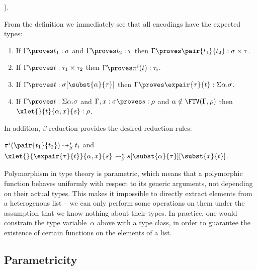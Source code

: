 
\cite[Chapter 6,7]{Kop2012}).

From the definition we immediately see that all encodings have the expected types:

\begin{lemma}\label{lem:encodings_types}
  \begin{enumerate}
  \item If $\Gamma \proves t_1 : \sigma$ and $\Gamma \proves t_2 :
    \tau$ then $\Gamma \proves \pair{t_1}{t_2} : \sigma \times \tau$.
  \item If $\Gamma \proves t : \tau_1 \times \tau_2$ then $\Gamma
    \proves \pi^i(t) : \tau_i$.
  \item If $\Gamma \proves t : \sigma[\subst{\alpha}{\tau}]$ then
    $\Gamma \proves \expair{\tau}{t} : \Sigma \alpha . \sigma$.
  \item If $\Gamma \proves t : \Sigma \alpha . \sigma$ and
    $\Gamma,x:\sigma \proves s : \rho$ and $\alpha \notin
    \FTV(\Gamma,\rho)$ then $\xlet{}{t}{\alpha,x}{s} : \rho$.
  \end{enumerate}
\end{lemma}

In addition, $\beta$-reduction provides the desired reduction rules:

\begin{lemma}\label{lem:encodings_reduce}
  $\pi^i(\pair{t_1}{t_2}) \leadsto_\beta^* t_i$ and
  $\xlet{}{\expair{\tau}{t}}{\alpha,x}{s} \leadsto_\beta^*
  s[\subst{\alpha}{\tau}][\subst{x}{t}]$.
\end{lemma}



Polymorphism in type theory is parametric, which means that a
polymorphic function behaves uniformly with respect to its generic
arguments, not depending on their actual types. This makes it
impossible to directly extract elements from a heterogenous list -- we
can only perform some operations on them under the assumption that we
know nothing about their types. In practice, one would constrain the
type variable~$\alpha$ above with a type class, in order to guarantee
the existence of certain functions on the elements of a list.


\subsection{Parametricity}

